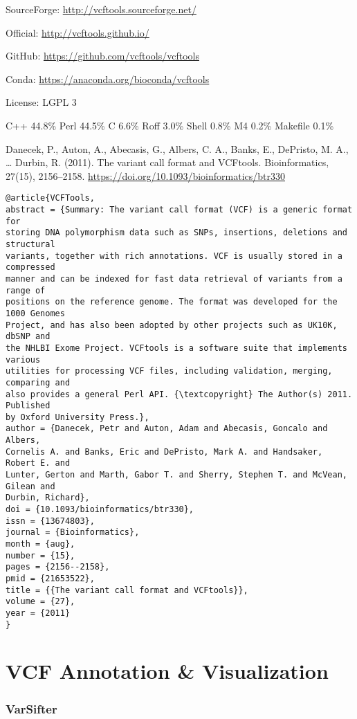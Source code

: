 \documentclass[]{article}
\begin{document}
SourceForge: \url{http://vcftools.sourceforge.net/}

Official: \url{http://vcftools.github.io/}

GitHub: \url{https://github.com/vcftools/vcftools}

Conda: \url{https://anaconda.org/bioconda/vcftools}

License: LGPL 3

C++ 44.8\% Perl 44.5\% C 6.6\% Roff 3.0\% Shell 0.8\% M4 0.2\% Makefile 0.1\%



Danecek, P., Auton, A., Abecasis, G., Albers, C. A., Banks, E., DePristo, M. A., … Durbin, R. (2011). The variant call format and VCFtools. Bioinformatics, 27(15), 2156–2158. \url{https://doi.org/10.1093/bioinformatics/btr330}

\begin{verbatim}
@article{VCFTools,
abstract = {Summary: The variant call format (VCF) is a generic format for
storing DNA polymorphism data such as SNPs, insertions, deletions and structural
variants, together with rich annotations. VCF is usually stored in a compressed
manner and can be indexed for fast data retrieval of variants from a range of
positions on the reference genome. The format was developed for the 1000 Genomes
Project, and has also been adopted by other projects such as UK10K, dbSNP and
the NHLBI Exome Project. VCFtools is a software suite that implements various
utilities for processing VCF files, including validation, merging, comparing and
also provides a general Perl API. {\textcopyright} The Author(s) 2011. Published
by Oxford University Press.},
author = {Danecek, Petr and Auton, Adam and Abecasis, Goncalo and Albers,
Cornelis A. and Banks, Eric and DePristo, Mark A. and Handsaker, Robert E. and
Lunter, Gerton and Marth, Gabor T. and Sherry, Stephen T. and McVean, Gilean and
Durbin, Richard},
doi = {10.1093/bioinformatics/btr330},
issn = {13674803},
journal = {Bioinformatics},
month = {aug},
number = {15},
pages = {2156--2158},
pmid = {21653522},
title = {{The variant call format and VCFtools}},
volume = {27},
year = {2011}
}
\end{verbatim}

\part{VCF Annotation \& Visualization}

\section{VarSifter}
\end{document}
